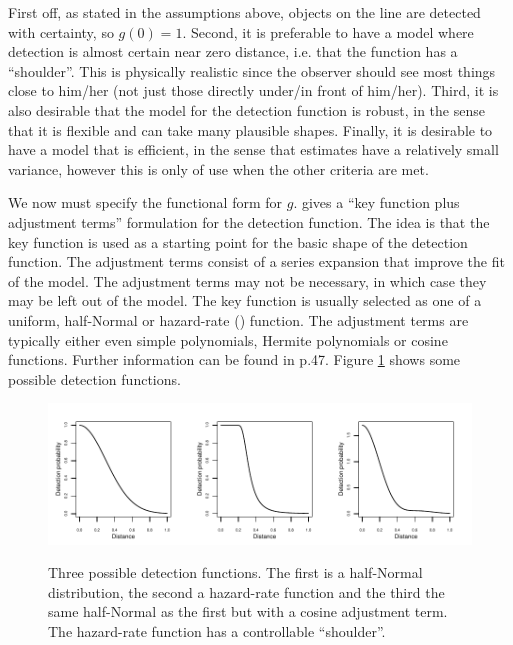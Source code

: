 First off, as stated in the assumptions above, objects on the line are detected with certainty, so $g(0)=1$. Second, it is preferable to have a model where detection is almost certain near zero distance, i.e. that the function has a ``shoulder''. This is physically realistic since the observer should see most things close to him/her (not just those directly under/in front of him/her). Third, it is also desirable that the model for the detection function is robust, in the sense that it is flexible and can take many plausible shapes. Finally, it is desirable to have a model that is efficient, in the sense that estimates have a relatively small variance, however this is only of use when the other criteria are met.

We now must specify the functional form for $g$. \cite{buckland92} gives a ``key function plus adjustment terms'' formulation for the detection function. The idea is that the key function is used as a starting point for the basic shape of the detection function. The adjustment terms consist of a series expansion that improve the fit of the model. The adjustment terms may not be necessary, in which case they may be left out of the model. The key function is usually selected as one of a uniform, half-Normal or hazard-rate (\cite{buckland85}) function. The adjustment terms are typically either even simple polynomials, Hermite polynomials or cosine functions. Further information can be found in \cite{IDS} p.47. Figure \ref{ds-detfct-examples} shows some possible detection functions.

\begin{figure}
\centering
\includegraphics{intro/figs/detfct-examples.pdf}\\
\caption{Three possible detection functions. The first is a half-Normal distribution, the second a hazard-rate function and the third the same half-Normal as the first but with a cosine adjustment term. The hazard-rate function has a controllable ``shoulder''.}
\label{ds-detfct-examples}
\end{figure}

